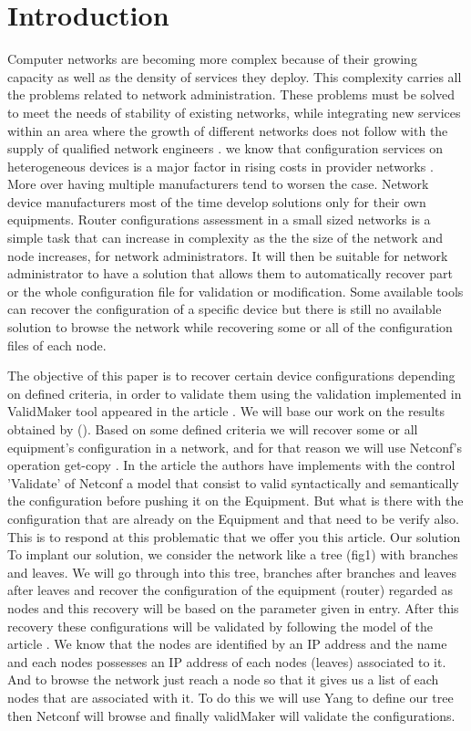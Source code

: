 \documentclass[10pt,conference]{IEEEtran}
\begin{document}
\section{Introduction} \label{sec:intro} %
Computer networks are becoming more complex because of their growing capacity as well as the density of services they deploy. This complexity carries all the problems related to network administration. These problems must be solved to meet the needs of stability of existing networks, while integrating new services within an area where the growth of different networks does not follow with the supply of qualified network engineers \citep{REF:6244/2011}. we know that configuration services on heterogeneous devices is a major factor in rising costs in provider networks \cite{USINEX:conf/time/William}. More over having multiple manufacturers tend to worsen the case. Network device manufacturers most of the time develop solutions only for their own equipments. Router configurations assessment  in a small sized  networks is a simple task that can increase in complexity as the the size of the network and node increases, for network administrators. It will then be suitable for network administrator to have a solution that  allows them to automatically recover part or the whole  configuration file for validation or modification. Some available  tools can recover  the configuration of a specific device but there is still no available solution to browse the network while recovering some or all of the configuration files of each node.

The objective of this paper is to recover certain device configurations depending on defined criteria,  in order to validate them using the validation implemented in ValidMaker tool appeared in the article \cite{NOMS:conf/time/noms2012}. We will base our work on the results obtained by (). Based on some defined criteria we will recover some or all equipment's configuration in a network, and for that reason we will use Netconf's operation get-copy .
In the article  \cite{Halleaformal} the authors have implements with the control 'Validate' of Netconf a model that consist to valid syntactically and semantically the configuration before pushing it on the Equipment. But what is there with the configuration that are already on the Equipment and that need to be verify also. This is to respond at this problematic that we offer you this article.
Our solution
To implant our solution, we consider the network like a tree (fig1) with branches and leaves. We will go through into this tree, branches after branches and leaves after leaves and recover the configuration of the equipment (router) regarded as nodes and this recovery will be based on the parameter given in entry. After this recovery these configurations will be validated by following the model of the article \cite{NOMS:conf/time/noms2012}.  We know that the nodes are identified by an IP address and the name and each nodes possesses an IP address of each nodes (leaves) associated to it. And to browse the network just reach a node so that it gives us a list of each nodes that are associated with it.
To do this we will use Yang to define our tree then Netconf will browse and finally validMaker will validate the configurations.
\end{document}
